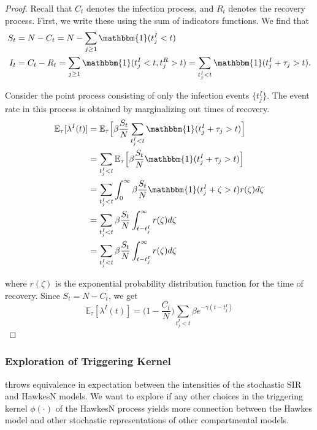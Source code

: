 \documentclass[12pt]{article}
\begin{document}
\begin{proof} Recall that $C_t$ denotes the infection process, and $R_t$ denotes the recovery process. First, we write these using the sum of indicators functions. We find that
\begin{align*}
S_t &= N - C_t = N - \sum_{j\geq 1} \mathbbm{1} (t_j^I < t) \\
I_t &= C_t - R_t = \sum_{j\geq 1} \mathbbm{1} (t_j^I < t, t_j^R > t) = \sum_{t_j^I < t} \mathbbm{1} (t_j^I + \tau_j > t). 
\end{align*} 
 
Consider the point process consisting of only the infection events $\{t_j^I\}$. The event rate in this process is obtained by marginalizing out times of recovery. 
\begin{align*}
\mathbb{E}_\tau [ \lambda^I (t)] 
&= \mathbb{E}_\tau \Big [\beta \frac{S_t}{N} \sum_{t_j^I < t} \mathbbm{1} (t_j^I + \tau_j > t) \Big ]\\ 
&= \sum_{t_j^I < t} \mathbb{E}_\tau \Big [\beta \frac{S_t}{N}  \mathbbm{1} (t_j^I + \tau_j > t) \Big ]\\
&= \sum_{t_j^I < t}\int_0^\infty \beta \frac{S_t}{N}  \mathbbm{1} (t_j^I + \zeta > t) r(\zeta) d\zeta \\
&= \sum_{t_j^I < t} \beta \frac{S_t}{N} \int_{t - t_j^I}^\infty r(\zeta) d\zeta \\
&= \sum_{t_j^I < t} \beta \frac{S_t}{N} \int_{t - t_j^I}^\infty r(\zeta) d\zeta
\end{align*}
 
where $r(\zeta)$ is the exponential probability distribution function for the time of recovery. Since $S_t = N - C_t$, we get
$$
\mathbb{E}_\tau [ \lambda^I (t)] = \Big (1 - \frac{C_t}{N} \Big ) \sum_{t_j^I < t}  \beta e^{- \gamma (t - t_j^I)}
$$ 
 
 
 
\end{proof}








\subsubsection{Exploration of Triggering Kernel}

\cite{Rizoiu2018} throws equivalence in expectation between the intensities of the stochastic SIR and HawkesN models. We want to explore if any other choices in the triggering kernel $\phi(\cdot )$ of the HawkesN process yields more connection between the Hawkes model and other stochastic representations of other compartmental models. 
\end{document}
